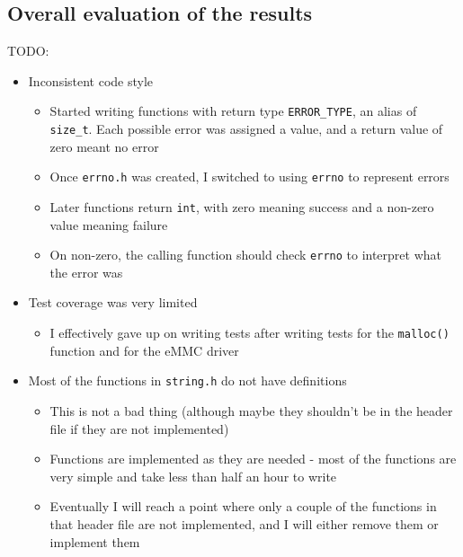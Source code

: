 \documentclass{article}
\begin{document}
\subsection{Overall evaluation of the results}
TODO:
\begin{itemize}
    \item Inconsistent code style
        \begin{itemize}
            \item Started writing functions with return type \verb!ERROR_TYPE!,
                an alias of \verb!size_t!. Each possible error was assigned a
                value, and a return value of zero meant no error
            \item Once \verb!errno.h! was created, I switched to using
                \verb!errno! to represent errors
            \item Later functions return \verb!int!, with zero meaning success
                and a non-zero value meaning failure
            \item On non-zero, the calling function should check \verb!errno!
                to interpret what the error was
        \end{itemize}
    \item Test coverage was very limited
        \begin{itemize}
            \item I effectively gave up on writing tests after writing tests
                for the \verb!malloc()! function and for the eMMC driver
        \end{itemize}
    \item Most of the functions in \verb!string.h! do not have definitions
        \begin{itemize}
            \item This is not a bad thing (although maybe they shouldn't be in
                the header file if they are not implemented)
            \item Functions are implemented as they are needed - most of the
                functions are very simple and take less than half an hour to
                write
            \item Eventually I will reach a point where only a couple of the
                functions in that header file are not implemented, and I will
                either remove them or implement them
        \end{itemize}
\end{itemize}
\end{document}
